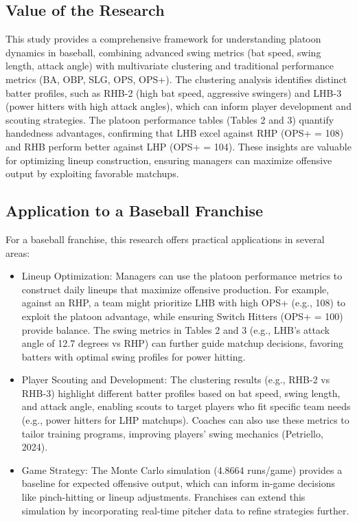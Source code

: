 \documentclass[
]{article}
\providecommand{\tightlist}{%
  \setlength{\itemsep}{0pt}\setlength{\parskip}{0pt}}
\begin{document}
\hypertarget{value-of-the-research}{%
\subsection{Value of the Research}\label{value-of-the-research}}

This study provides a comprehensive framework for understanding platoon
dynamics in baseball, combining advanced swing metrics (bat speed, swing
length, attack angle) with multivariate clustering and traditional
performance metrics (BA, OBP, SLG, OPS, OPS+). The clustering analysis
identifies distinct batter profiles, such as RHB-2 (high bat speed,
aggressive swingers) and LHB-3 (power hitters with high attack angles),
which can inform player development and scouting strategies. The platoon
performance tables (Tables 2 and 3) quantify handedness advantages,
confirming that LHB excel against RHP (OPS+ = 108) and RHB perform
better against LHP (OPS+ = 104). These insights are valuable for
optimizing lineup construction, ensuring managers can maximize offensive
output by exploiting favorable matchups.

\hypertarget{application-to-a-baseball-franchise}{%
\subsection{Application to a Baseball
Franchise}\label{application-to-a-baseball-franchise}}

For a baseball franchise, this research offers practical applications in
several areas:

\begin{itemize}
\tightlist
\item
  Lineup Optimization: Managers can use the platoon performance metrics
  to construct daily lineups that maximize offensive production. For
  example, against an RHP, a team might prioritize LHB with high OPS+
  (e.g., 108) to exploit the platoon advantage, while ensuring Switch
  Hitters (OPS+ = 100) provide balance. The swing metrics in Tables 2
  and 3 (e.g., LHB's attack angle of 12.7 degrees vs RHP) can further
  guide matchup decisions, favoring batters with optimal swing profiles
  for power hitting.
\item
  Player Scouting and Development: The clustering results (e.g., RHB-2
  vs RHB-3) highlight different batter profiles based on bat speed,
  swing length, and attack angle, enabling scouts to target players who
  fit specific team needs (e.g., power hitters for LHP matchups).
  Coaches can also use these metrics to tailor training programs,
  improving players' swing mechanics (Petriello, 2024).
\item
  Game Strategy: The Monte Carlo simulation (4.8664 runs/game) provides
  a baseline for expected offensive output, which can inform in-game
  decisions like pinch-hitting or lineup adjustments. Franchises can
  extend this simulation by incorporating real-time pitcher data to
  refine strategies further.
\end{itemize}
\end{document}
